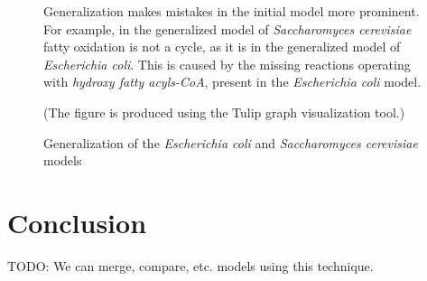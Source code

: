 \documentclass[10pt]{bmc_article}
\newenvironment{bmcformat}{\baselineskip20pt\sloppy\setboolean{publ}{false}}{\baselineskip20pt\sloppy}
\begin{document}
\begin{bmcformat}
\begin{figure}
      Generalization makes mistakes in the initial model more prominent. For example, in the generalized model of \textit{Saccharomyces cerevisiae} fatty oxidation is not a cycle, as it is in the generalized model of \textit{Escherichia coli}.  This is caused by the missing reactions operating with \textit{hydroxy fatty acyls-CoA}, present in the \textit{Escherichia coli} model.
      
      (The figure is produced using the Tulip graph visualization tool.)
\caption{Generalization of the \textit{Escherichia coli} and \textit{Saccharomyces cerevisiae} models}
\label{fig:gen}
\end{figure}


\section*{Conclusion}
TODO: We can merge, compare, etc. models using this technique.

\newpage
%
%
%		
%			
%








\newpage
{
  
 }     %




\end{bmcformat}
\end{document}
